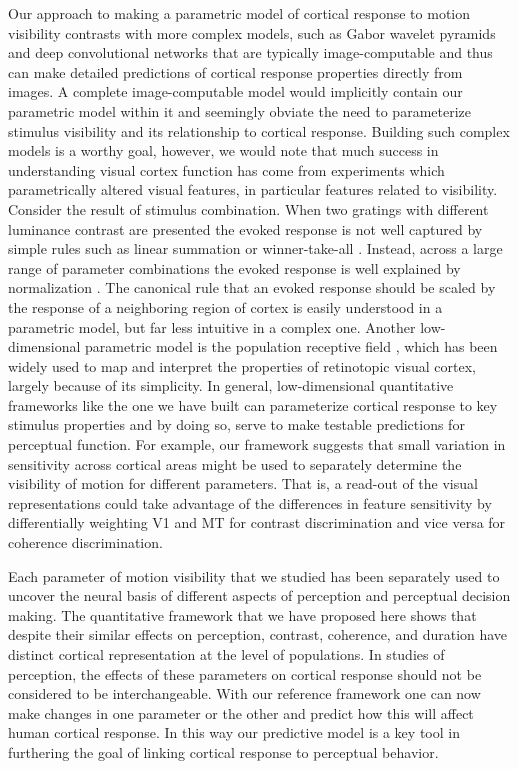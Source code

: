 Our approach to making a parametric model of cortical response to motion visibility contrasts with more complex models, such as Gabor wavelet pyramids and deep convolutional networks \citep{Kay2008-mj,Kay2017-bj,Yamins2014-rm} that are typically image-computable and thus can make detailed predictions of cortical response properties directly from images. A complete image-computable model would implicitly contain our parametric model within it and seemingly obviate the need to parameterize stimulus visibility and its relationship to cortical response. Building such complex models is a worthy goal, however, we would note that much success in understanding visual cortex function has come from experiments which parametrically altered visual features, in particular features related to visibility. Consider the result of stimulus combination. When two gratings with different luminance contrast are presented the evoked response is not well captured by simple rules such as linear summation or winner-take-all \citep{Busse2009-pt}. Instead, across a large range of parameter combinations the evoked response is well explained by normalization \citep{Carandini2011-va}. The canonical rule that an evoked response should be scaled by the response of a neighboring region of cortex is easily understood in a parametric model, but far less intuitive in a complex one. Another low-dimensional parametric model is the population receptive field \citep{Dumoulin2008-uc,Wandell2015-uv}, which has been widely used to map and interpret the properties of retinotopic visual cortex, largely because of its simplicity. In general, low-dimensional quantitative frameworks like the one we have built can parameterize cortical response to key stimulus properties and by doing so, serve to make testable predictions for perceptual function. For example, our framework suggests that small variation in sensitivity across cortical areas might be used to separately determine the visibility of motion for different parameters. That is, a read-out of the visual representations could take advantage of the differences in feature sensitivity by differentially weighting V1 and MT for contrast discrimination and vice versa for coherence discrimination.

Each parameter of motion visibility that we studied has been separately used to uncover the neural basis of different aspects of perception and perceptual decision making. The quantitative framework that we have proposed here shows that despite their similar effects on perception, contrast, coherence, and duration have distinct cortical representation at the level of populations. In studies of perception, the effects of these parameters on cortical response should not be considered to be interchangeable. With our reference framework one can now make changes in one parameter or the other and predict how this will affect human cortical response. In this way our predictive model is a key tool in furthering the goal of linking cortical response to perceptual behavior.